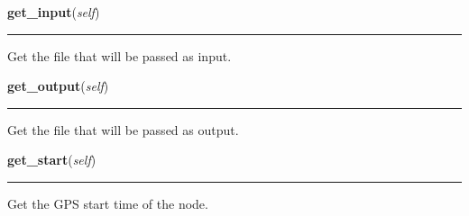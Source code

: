     \label{pipeline:AnalysisNode:get_input}
    \vspace{0.5ex}

    \noindent\begin{boxedminipage}{\textwidth}

    \raggedright \textbf{get\_input}(\textit{self})

    \vspace{-1.5ex}

    \rule{\textwidth}{0.5\fboxrule}
    Get the file that will be passed as input.

    \vspace{1ex}

    \end{boxedminipage}

    \label{pipeline:AnalysisNode:get_output}
    \vspace{0.5ex}

    \noindent\begin{boxedminipage}{\textwidth}

    \raggedright \textbf{get\_output}(\textit{self})

    \vspace{-1.5ex}

    \rule{\textwidth}{0.5\fboxrule}
    Get the file that will be passed as output.

    \vspace{1ex}

    \end{boxedminipage}

    \label{pipeline:AnalysisNode:get_start}
    \vspace{0.5ex}

    \noindent\begin{boxedminipage}{\textwidth}

    \raggedright \textbf{get\_start}(\textit{self})

    \vspace{-1.5ex}

    \rule{\textwidth}{0.5\fboxrule}
    Get the GPS start time of the node.

    \vspace{1ex}

    \end{boxedminipage}

